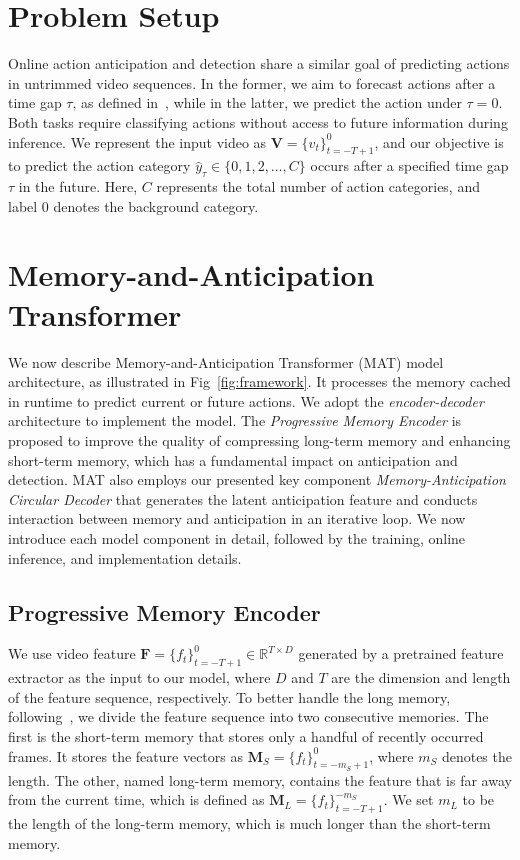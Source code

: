 



\section{Problem Setup}
\label{sec:problem}
Online action anticipation and detection share a similar goal of predicting actions in untrimmed video sequences. In the former, we aim to forecast actions after a time gap $\tau$, as defined in~\cite{ek100}, while in the latter, we predict the action under $\tau=0$.
Both tasks require classifying actions without access to future information during inference.
We represent the input video as 
$ \mathbf{V} = \{ v_t \}_{t = -T + 1}^{0} $,
and our objective is to predict the action category $\hat{y}_{\tau} \in \{ 0, 1, 2, \dots, C \}$ occurs after a specified time gap $\tau$ in the future. Here, $C$ represents the total number of action categories, and label $ 0 $ denotes the background category.



\section{Memory-and-Anticipation Transformer}
\label{sec:approach}
We now describe Memory-and-Anticipation Transformer (MAT) model architecture, as illustrated in Fig~\ref{fig:framework}. It processes the memory cached in runtime to predict current or future actions. We adopt the \emph{encoder-decoder} architecture to implement the model. The \emph{Progressive Memory Encoder} is proposed to improve the quality of compressing long-term memory and enhancing short-term memory, which has a fundamental impact on anticipation and detection. MAT also employs our presented key component \emph{Memory-Anticipation Circular Decoder} that generates the latent anticipation feature and conducts interaction between memory and anticipation in an iterative loop.
We now introduce each model component in detail, followed by the training, online inference, and implementation details.

\subsection{Progressive Memory Encoder}

We use video feature $\mathbf{F} = \{ f_t \}_{t = -T + 1}^{0} \in \mathbb{R}^{T \times D}$ generated by a pretrained feature extractor as the input to our model, where $D$ and $T$ are the dimension and length of the feature sequence, respectively. 
To better handle the long memory, following~\cite{lstr}, we divide the feature sequence into two consecutive memories. The first is the short-term memory that stores only a handful of recently occurred frames. It stores the feature vectors as $ \mathbf{M}_S = \{ f_t \}_{t = -m_S + 1}^{0}$, where $ m_S $ denotes the length. The other, named long-term memory, contains the feature that is far away from the current time, which is defined as $\mathbf{M}_L = \{ f_t \}_{t = -T + 1}^{-m_S} $. We set $ m_L $ to be the length of the long-term memory, which is much longer than the short-term memory.

